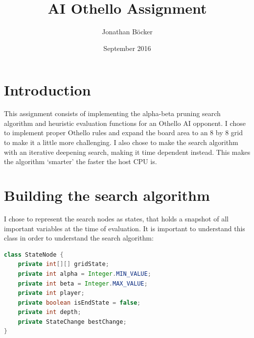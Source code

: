 \documentclass{article}
\title{AI Othello Assignment}
\author{Jonathan Böcker}
\date{September 2016}
\begin{document}
\maketitle

\section{Introduction}

This assignment consists of implementing the alpha-beta pruning search algorithm \citep{russel2010artifical}
and heuristic evaluation functions for an Othello AI opponent. I chose to implement
proper Othello rules and expand the board area to an 8 by 8 grid to make it a little
more challenging. I also chose to make the search algorithm with an iterative deepening search,
making it time dependent instead.
This makes the algorithm `smarter' the faster the host CPU is.

\section{Building the search algorithm}

I chose to represent the search nodes as states, that holds a snapshot of all important
variables at the time of evaluation. It is important to understand this class in order to understand
the search algorithm:

\begin{lstlisting}[language=Java]
class StateNode {
    private int[][] gridState;
    private int alpha = Integer.MIN_VALUE;
    private int beta = Integer.MAX_VALUE;
    private int player;
    private boolean isEndState = false;
    private int depth;
    private StateChange bestChange;
}
\end{lstlisting}
\end{document}
